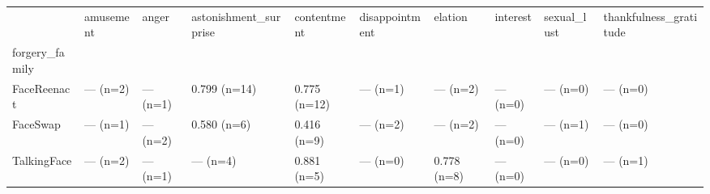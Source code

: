 \begin{tabular}{llllllllll}
\toprule
 & amusement & anger & astonishment\_surprise & contentment & disappointment & elation & interest & sexual\_lust & thankfulness\_gratitude \\
forgery\_family &  &  &  &  &  &  &  &  &  \\
\midrule
FaceReenact & — (n=2) & — (n=1) & 0.799 (n=14) & 0.775 (n=12) & — (n=1) & — (n=2) & — (n=0) & — (n=0) & — (n=0) \\
FaceSwap & — (n=1) & — (n=2) & 0.580 (n=6) & 0.416 (n=9) & — (n=2) & — (n=2) & — (n=0) & — (n=1) & — (n=0) \\
TalkingFace & — (n=2) & — (n=1) & — (n=4) & 0.881 (n=5) & — (n=0) & 0.778 (n=8) & — (n=0) & — (n=0) & — (n=1) \\
\bottomrule
\end{tabular}
